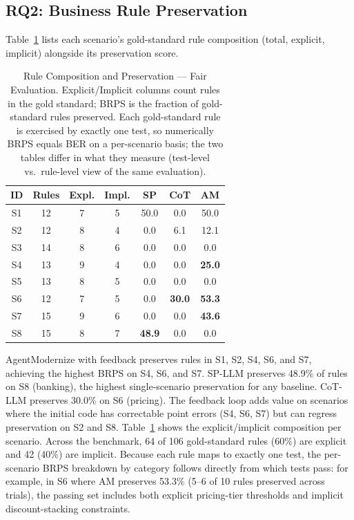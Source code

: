 \documentclass[conference]{IEEEtran}
\begin{document}
\subsection{RQ2: Business Rule Preservation}

Table~\ref{tab:rq2} lists each scenario's gold-standard rule composition (total, explicit, implicit) alongside its preservation score.

\begin{table}[htbp]
\caption{Rule Composition and Preservation --- Fair Evaluation. Explicit/Implicit columns count rules in the gold standard; BRPS is the fraction of gold-standard rules preserved. Each gold-standard rule is exercised by exactly one test, so numerically BRPS equals BER on a per-scenario basis; the two tables differ in what they measure (test-level vs.\ rule-level view of the same evaluation).}
\label{tab:rq2}
\centering
\footnotesize
\begin{tabular}{@{}ccccccc@{}}
\toprule
\textbf{ID} & \textbf{Rules} & \textbf{Expl.} & \textbf{Impl.} & \textbf{SP} & \textbf{CoT} & \textbf{AM} \\
\midrule
S1 & 12 & 7 & 5 & 50.0 & 0.0 & 50.0 \\
S2 & 12 & 8 & 4 & 0.0 & 6.1 & 12.1 \\
S3 & 14 & 8 & 6 & 0.0 & 0.0 & 0.0 \\
S4 & 13 & 9 & 4 & 0.0 & 0.0 & \textbf{25.0} \\
S5 & 13 & 8 & 5 & 0.0 & 0.0 & 0.0 \\
S6 & 12 & 7 & 5 & 0.0 & \textbf{30.0} & \textbf{53.3} \\
S7 & 15 & 9 & 6 & 0.0 & 0.0 & \textbf{43.6} \\
S8 & 15 & 8 & 7 & \textbf{48.9} & 0.0 & 0.0 \\
\bottomrule
\end{tabular}
\end{table}

AgentModernize with feedback preserves rules in S1, S2, S4, S6, and S7, achieving the highest BRPS on S4, S6, and S7. SP-LLM preserves 48.9\% of rules on S8 (banking), the highest single-scenario preservation for any baseline. CoT-LLM preserves 30.0\% on S6 (pricing). The feedback loop adds value on scenarios where the initial code has correctable point errors (S4, S6, S7) but can regress preservation on S2 and S8. Table~\ref{tab:rq2} shows the explicit/implicit composition per scenario. Across the benchmark, 64 of 106 gold-standard rules (60\%) are explicit and 42 (40\%) are implicit. Because each rule maps to exactly one test, the per-scenario BRPS breakdown by category follows directly from which tests pass: for example, in S6 where AM preserves 53.3\% (5--6 of 10 rules preserved across trials), the passing set includes both explicit pricing-tier thresholds and implicit discount-stacking constraints.
\end{document}
